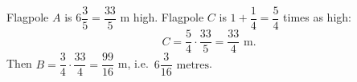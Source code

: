 Flagpole $A$ is $6\dfrac{3}{5}=\dfrac{33}{5}$ m high. Flagpole $C$ is $1+\dfrac{1}{4}=\dfrac{5}{4}$ times as high:
\[
C=\dfrac{5}{4}\cdot\dfrac{33}{5}=\dfrac{33}{4}\text{ m}.
\]
Then $B=\dfrac{3}{4}\cdot\dfrac{33}{4}=\dfrac{99}{16}$ m, i.e.\ $\boxed{6\dfrac{3}{16}\text{ metres}}$.
